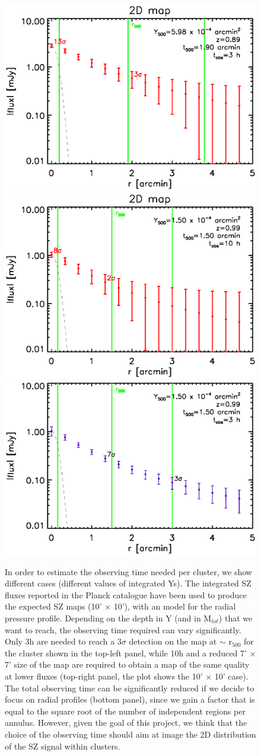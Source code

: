 \documentclass[11pt,a4paper,twoside,graphicx,color]{article}
\begin{document}
\begin{figure}
  \centering
   \includegraphics[width=0.48\columnwidth]{./Figures/NIKA2_cl_tobs_3h_det.eps}
   \includegraphics[width=0.48\columnwidth]{./Figures/NIKA2_cl_tobs_10h_det.eps}
   \includegraphics[width=0.48\columnwidth]{./Figures/NIKA2_cl_det_pr.eps}
\caption{In order to estimate the observing time needed per cluster, we show different cases (different values of integrated Ys). The integrated SZ fluxes reported in the Planck catalogue \citep{PSZ1} have been used to produce the expected SZ maps (10' $\times$ 10'), with an \cite{Arnaud2010} model for the radial pressure profile. Depending on the depth in Y (and in M$_{tot}$) that we want to reach, the observing time required can vary significantly. Only 3h are needed to reach a 3$\sigma$ detection on the map at $\sim$ r$_{500}$ for the cluster shown in the top-left panel, while 10h and a reduced 7' $\times$ 7' size of the map are required to obtain a map of the same quality at lower fluxes (top-right panel, the plot shows the 10' $\times$ 10' case). The total observing time can be significantly reduced if we decide to focus on radial profiles (bottom panel), since we gain a factor that is equal to the square root of the number of independent regions per annulus. However, given the goal of this project, we think that the choice of the observing time should aim at image the 2D distribution of the SZ signal within clusters.}
\label{Fig:obs_time}
\end{figure}
\end{document}
